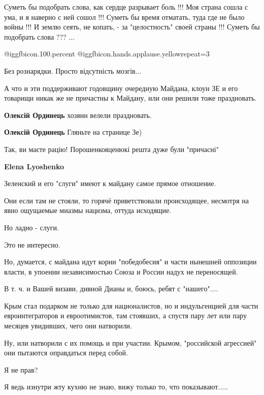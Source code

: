 \begin{itemize}

Суметь бы подобрать слова, как сердце разрывает боль !!! Моя страна сошла с
ума, и я наверно с ней сошол !!! Суметь бы время отматать, туда где не было
войны !!! И землю сеять, не копать, - за "целостность" своей страны !!!  Суметь
бы подобрать слова ??? ...


 @igg{fbicon.100.percent}  @igg{fbicon.hands.applause.yellow}{repeat=3} 

Без рознарядки. Просто відсутність мозгів...


А что и эти поддерживают годовщину очередную Майдана, клоун ЗЕ и его товарищи
никак же не причастны к Майдану, или они решили тоже праздновать.

\begin{itemize} %
\textbf{Олексій Ординець} хозяин велели праздновать.

\textbf{Олексій Ординець}
Гляньте на странице Зе)

Так, ви маєте рацію!
Порошенкояценюкі решта дуже були "причасні"

\textbf{Elena Lyoshenko} 

Зеленский и его "слуги" имеют к майдану самое прямое отношение.

Они если там не стояли, то горячё приветствовали происходящее, несмотря на явно
ощущаемые миазмы нацизма, оттуда исходящие.

Но ладно - слуги.

Это не интересно.

Но, думается, с майдана идут корни "победобесия" и части нынешней оппозиции
власти, в упоении независимостью Союза и России надух не переносящей.

В т. ч. и Вашей визави, дивной Дианы и, боюсь, ребят с "нашего"....

Крым стал подарком не только для националистов, но и индульгенцией для части
евроинтеграторов и евроотимистов, там стоявших, а спустя пару лет или пару
месяцев увидивших, чего они натворили.

Ну, или натворили с их помощь и при участии. Крымом, "российской агрессией" они
пытаются оправдаться перед собой.

Я не прав?

Я ведь изнутри жту кухню не знаю, вижу только то, что показывают.....


\end{itemize}
\end{itemize}
